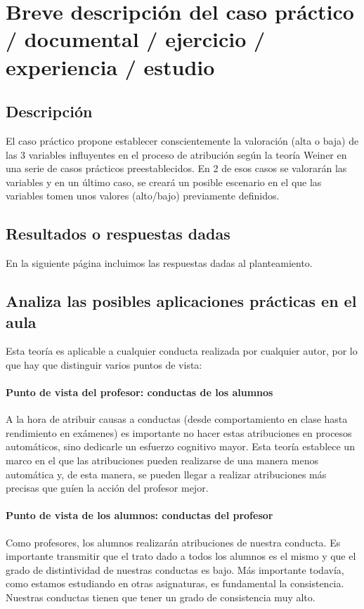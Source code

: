 \documentclass[palatino,nochap]{apuntesURJC}
\begin{document}
\section{Breve descripción del caso práctico / documental / ejercicio / experiencia / estudio}

\subsection{Descripción}
El caso práctico propone establecer conscientemente la valoración (alta o baja) de las 3 variables influyentes en el proceso de atribución según la teoría Weiner en una serie de casos prácticos preestablecidos.
%
En 2 de esos casos se valorarán las variables y en un último caso, se creará un posible escenario en el que las variables tomen unos valores (alto/bajo) previamente definidos.

\subsection{Resultados o respuestas dadas}

En la siguiente página incluimos las respuestas dadas al planteamiento.



\subsection{Analiza las posibles aplicaciones prácticas en el aula}

Esta teoría es aplicable a cualquier conducta realizada por cualquier autor, por lo que hay que distinguir varios puntos de vista:

\paragraph{Punto de vista del profesor: conductas de los alumnos} A la hora de atribuir causas a conductas (desde comportamiento en clase hasta rendimiento en exámenes) es importante no hacer estas atribuciones en procesos automáticos, sino dedicarle un esfuerzo cognitivo mayor. 
%
Esta teoría establece un marco en el que las atribuciones pueden realizarse de una manera menos automática y, de esta manera, se pueden llegar a realizar atribuciones más precisas que guíen la acción del profesor mejor. 

\paragraph{Punto de vista de los alumnos: conductas del profesor} Como profesores,  los alumnos realizarán atribuciones de nuestra conducta. 
%
Es importante transmitir que el trato dado a todos los alumnos es el mismo y que el grado de distintividad de nuestras conductas es bajo. 
%
Más importante todavía, como estamos estudiando en otras asignaturas, es fundamental la consistencia. 
%
Nuestras conductas tienen que tener un grado de consistencia muy alto.
\end{document}
